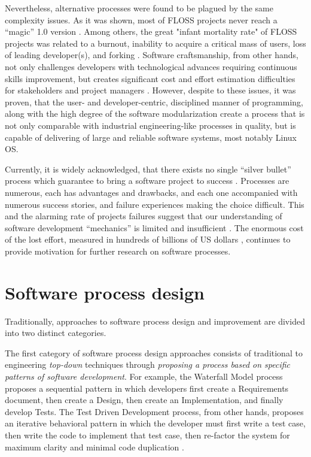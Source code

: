 Nevertheless, alternative processes were found to be plagued by the same complexity issues. 
As it was shown, most of FLOSS projects never reach a ``magic'' 1.0 version \cite{citeulike:12480029}. 
Among others, the great "infant mortality rate" of FLOSS projects was related to a burnout, 
inability to acquire a critical mass of users, loss of leading developer(s), and forking \cite{richter2007critique}. 
Software craftsmanship, from other hands, not only challenges developers with technological advances 
requiring continuous skills improvement, but creates significant cost and effort estimation difficulties for
stakeholders and project managers \cite{citeulike:11058784}. However, despite to these issues, 
it was proven, that the user- and developer-centric, disciplined manner of programming, along with the high 
degree of the software modularization create a process that is not only comparable with industrial 
engineering-like processes in quality, but is capable of delivering of large and reliable software systems, 
most notably Linux OS.

Currently, it is widely acknowledged, that there exists no single ``silver bullet'' process which 
guarantee to bring a software project to success \cite{citeulike:1986013}. 
Processes are numerous, each has advantages and drawbacks, and each one accompanied with 
numerous success stories, and failure experiences making the choice difficult. 
This and the alarming rate of projects failures suggest that our understanding of software 
development ``mechanics''  is limited and insufficient \cite{citeulike:12550665}. 
The enormous cost of the lost effort, measured in hundreds of billions of US dollars 
\cite{citeulike:2207657} \cite{citeulike:2207653} \cite{citeulike:2207655}, 
continues to provide motivation for further research on software processes. 

%
%
\section{Software process design}\label{section_software_process_design}
Traditionally, approaches to software process design and improvement are divided into two distinct categories. 

The first category of software process design approaches consists of traditional to engineering 
\textit{top-down} techniques through 
\textit{proposing a process based on specific patterns of software development}. 
For example, the Waterfall Model process proposes a sequential pattern in which developers first create a 
Requirements document, then create a Design, then create an Implementation, and finally develop Tests. 
The Test Driven Development process, from other hands, proposes an iterative behavioral pattern in which
the developer must first write a test case, then write the code to implement that test case, then re-factor the 
system for maximum clarity and minimal code duplication \cite{citeulike:6086365}. 

